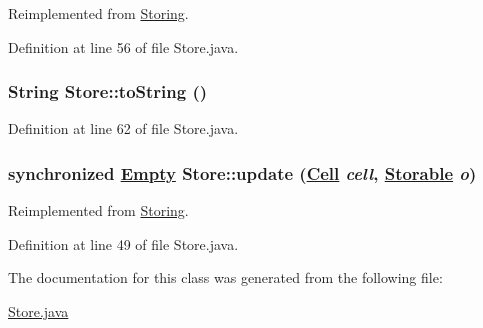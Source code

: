 Reimplemented from \hyperlink{interfaceStoring_a3}{Storing}.

Definition at line 56 of file Store.java.\hypertarget{classStore_a4}{
\subsubsection[toString]{\setlength{\rightskip}{0pt plus 5cm}String Store::to\-String ()}}
\label{classStore_a4}




Definition at line 62 of file Store.java.\hypertarget{classStore_a2}{
\subsubsection[update]{\setlength{\rightskip}{0pt plus 5cm}synchronized \hyperlink{interfaceEmpty}{Empty} Store::update (\hyperlink{interfaceCell}{Cell} {\em cell}, \hyperlink{interfaceStorable}{Storable} {\em o})}}
\label{classStore_a2}




Reimplemented from \hyperlink{interfaceStoring_a2}{Storing}.

Definition at line 49 of file Store.java.

The documentation for this class was generated from the following file:\begin{CompactItemize}
\item 
\hyperlink{Store_8java-source}{Store.java}\end{CompactItemize}
